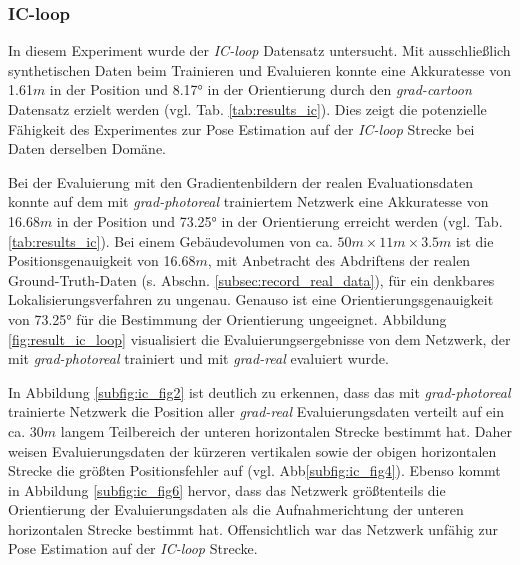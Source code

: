 \subsubsection{IC-loop}

In diesem Experiment wurde der \textit{IC-loop} Datensatz untersucht. 
Mit ausschließlich synthetischen Daten beim Trainieren und Evaluieren konnte eine Akkuratesse von 1.61$m$ in der Position und 8.17° in der Orientierung durch den \textit{grad-cartoon} Datensatz erzielt werden (vgl. Tab. \ref{tab:results_ic}). Dies zeigt die potenzielle Fähigkeit des Experimentes zur Pose Estimation auf der \textit{IC-loop} Strecke bei Daten derselben Domäne. 

Bei der Evaluierung mit den Gradientenbildern der realen Evaluationsdaten konnte auf dem mit \textit{grad-photoreal} trainiertem Netzwerk eine Akkuratesse von 16.68$m$ in der Position und 73.25° in der Orientierung erreicht werden (vgl. Tab. \ref{tab:results_ic}). Bei einem Gebäudevolumen von ca. $50m \times 11m \times 3.5m$ ist die Positionsgenauigkeit von 16.68$m$, mit Anbetracht des Abdriftens der realen Ground-Truth-Daten (s. Abschn. \ref{subsec:record_real_data}), für ein denkbares Lokalisierungsverfahren zu ungenau. Genauso ist eine Orientierungsgenauigkeit von 73.25° für die Bestimmung der Orientierung ungeeignet. Abbildung \ref{fig:result_ic_loop} visualisiert die Evaluierungsergebnisse von dem Netzwerk, der mit \textit{grad-photoreal} trainiert und mit \textit{grad-real} evaluiert wurde.

In Abbildung \ref{subfig:ic_fig2} ist deutlich zu erkennen, dass das mit \textit{grad-photoreal} trainierte Netzwerk die Position aller \textit{grad-real} Evaluierungsdaten verteilt auf ein ca. 30$m$ langem Teilbereich der unteren horizontalen Strecke bestimmt hat. Daher weisen Evaluierungsdaten der kürzeren vertikalen sowie der obigen horizontalen Strecke die größten Positionsfehler auf (vgl. Abb\ref{subfig:ic_fig4}). Ebenso kommt in Abbildung \ref{subfig:ic_fig6} hervor, dass das Netzwerk größtenteils die Orientierung der Evaluierungsdaten als die Aufnahmerichtung der unteren horizontalen Strecke bestimmt hat. Offensichtlich war das Netzwerk unfähig zur Pose Estimation auf der \textit{IC-loop} Strecke.


